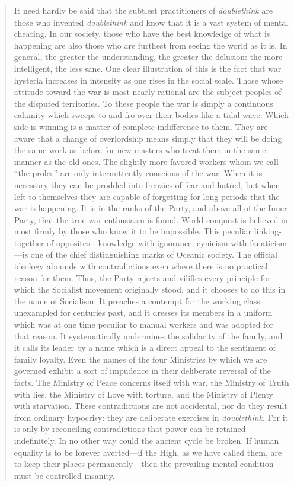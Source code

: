 \begin{quotation}
It need hardly be said that the subtlest practitioners of
\emph{doublethink} are those who invented \emph{doublethink} and know
that it is a vast system of mental cheating. In our society, those who
have the best knowledge of what is happening are also those who are
furthest from seeing the world as it is. In general, the greater the
understanding, the greater the delusion: the more intelligent, the less
sane. One clear illustration of this is the fact that war hysteria
increases in intensity as one rises in the social scale. Those whose
attitude toward the war is most nearly rational are the subject peoples
of the disputed territories. To these people the war is simply a
continuous calamity which sweeps to and fro over their bodies like a
tidal wave. Which side is winning is a matter of complete indifference
to them. They are aware that a change of overlordship means simply that
they will be doing the same work as before for new masters who treat
them in the same manner as the old ones. The slightly more favored
workers whom we call ``the proles'' are only intermittently conscious of
the war. When it is necessary they can be prodded into frenzies of fear
and hatred, but when left to themselves they are capable of forgetting
for long periods that the war is happening. It is in the ranks of the
Party, and above all of the Inner Party, that the true war enthusiasm is
found. World-conquest is believed in most firmly by those who know it to
be impossible. This peculiar linking-together of opposites---knowledge
with ignorance, cynicism with fanaticism---is one of the chief
distinguishing marks of Oceanic society. The official ideology abounds
with contradictions even where there is no practical reason for them.
Thus, the Party rejects and vilifies every principle for which the
Socialist movement originally stood, and it chooses to do this in the
name of Socialism. It preaches a contempt for the working class
unexampled for centuries past, and it dresses its members in a uniform
which was at one time peculiar to manual workers and was adopted for
that reason. It systematically undermines the solidarity of the family,
and it calls its leader by a name which is a direct appeal to the
sentiment of family loyalty. Even the names of the four Ministries by
which we are governed exhibit a sort of impudence in their deliberate
reversal of the facts. The Ministry of Peace concerns itself with war,
the Ministry of Truth with lies, the Ministry of Love with torture, and
the Ministry of Plenty with starvation. These contradictions are not
accidental, nor do they result from ordinary hypocrisy: they are
deliberate exercises in \emph{doublethink}. For it is only by
reconciling contradictions that power can be retained indefinitely. In
no other way could the ancient cycle be broken. If human equality is to
be forever averted---if the High, as we have called them, are to keep
their places permanently---then the prevailing mental condition must be
controlled insanity.


\end{quotation}
